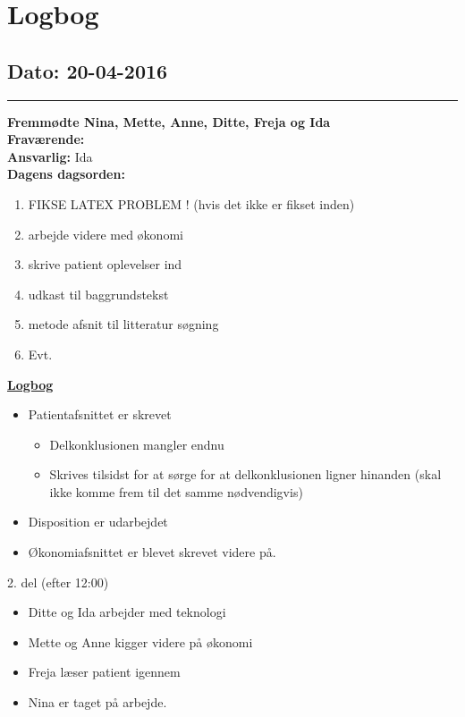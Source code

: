 \chapter{Logbog}
\section{Dato: 20-04-2016}
\hrule
\textbf{Fremmødte Nina, Mette, Anne, Ditte, Freja og Ida } \\
\textbf{Fraværende: } \\
\textbf{Ansvarlig:} Ida  \\
\textbf{Dagens dagsorden: }
\begin{enumerate}
	\item FIKSE LATEX PROBLEM ! (hvis det ikke er fikset inden)
	\item arbejde videre med økonomi
	\item skrive patient oplevelser ind
	\item udkast til baggrundstekst
	\item metode afsnit til litteratur søgning
	\item Evt. 
\end{enumerate}

\underline{\textbf{Logbog}}
\begin{itemize}
\item Patientafsnittet er skrevet
\begin{itemize}
\item Delkonklusionen mangler endnu 
\item Skrives tilsidst for at sørge for at delkonklusionen ligner hinanden (skal ikke komme frem til det samme nødvendigvis)
\end{itemize}
\item Disposition er udarbejdet
\item Økonomiafsnittet er blevet skrevet videre på.
\end{itemize}
2. del (efter 12:00)
\begin{itemize}
\item Ditte og Ida arbejder med teknologi
\item Mette og Anne kigger videre på økonomi
\item Freja læser patient igennem
\item Nina er taget på arbejde.
\end{itemize}
\newpage